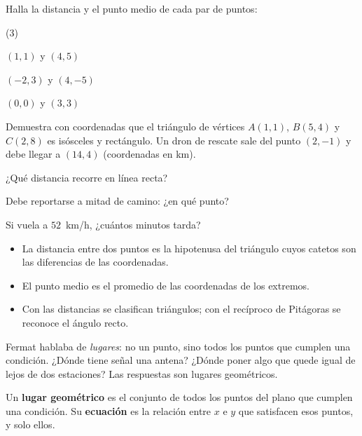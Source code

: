 \documentclass[11pt]{article}
\begin{document}
\begin{preguntas}
\pregunta Halla la distancia y el punto medio de cada par de puntos:
\begin{opciones*}(3)
  \item $(1, 1)$ y $(4, 5)$
  \item $(-2, 3)$ y $(4, -5)$
  \item $(0, 0)$ y $(3, 3)$
\end{opciones*}
\espacio{3cm}
\pregunta Demuestra con coordenadas que el triángulo de vértices $A(1, 1)$,
$B(5, 4)$ y $C(2, 8)$ es isósceles y rectángulo.
\espacio{3.5cm}
\pregunta Un dron de rescate sale del punto $(2, -1)$ y debe llegar a
$(14, 4)$ (coordenadas en km).
\begin{opciones}
  \item ¿Qué distancia recorre en línea recta?
  \item Debe reportarse a mitad de camino: ¿en qué punto?
  \item Si vuela a $52$~km/h, ¿cuántos minutos tarda?
\end{opciones}
\espacio{3.5cm}
\end{preguntas}

\begin{resumen}
\begin{itemize}
  \item La distancia entre dos puntos es la hipotenusa del triángulo cuyos
        catetos son las diferencias de las coordenadas.
  \item El punto medio es el promedio de las coordenadas de los extremos.
  \item Con las distancias se clasifican triángulos; con el recíproco de
        Pitágoras se reconoce el ángulo recto.
\end{itemize}
\end{resumen}

\label{tema:lugaresgeometricos}

\begin{hilo}
Fermat hablaba de \emph{lugares}: no un punto, sino todos los puntos que
cumplen una condición. ¿Dónde tiene señal una antena? ¿Dónde poner algo que
quede igual de lejos de dos estaciones? Las respuestas son lugares
geométricos.
\end{hilo}

\begin{definicion}
Un \textbf{lugar geométrico} es el conjunto de todos los puntos del plano que
cumplen una condición. Su \textbf{ecuación} es la relación entre $x$ e $y$ que
satisfacen esos puntos, y solo ellos.
\end{definicion}
\end{document}
